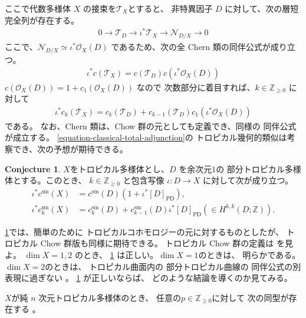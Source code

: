\documentclass[a4paper,dvipdfmx,reqno,12pt]{amsart}
\theoremstyle{definition}
\newtheorem{conjecture}[theorem]{Conjecture}
\newcommand{\PD}[1]{[#1]_{\mathrm{PD}}}
\numberwithin{equation}{section}
\begin{document}
ここで代数多様体 $X$ の接束を$\mathcal{T}_X$とすると、
非特異因子 $D$ に対して、次の層短完全列が存在する。
\begin{align}
0 \to \mathcal{T}_{D}\to \iota^{*}\mathcal{T}_X
\to \mathcal{N}_{D/X}\to 0
\end{align}
ここで、$\mathcal{N}_{D/X}\simeq \iota^{*}\mathcal{O}_X(D)$
であるため、次の全 Chern 類の同伴公式が成り立つ。
\begin{align}
\label{equation-classical-total-adjunction}
\iota^{*}c(\mathcal{T}_X)
=c(\mathcal{T}_{D})c(\iota^{*}\mathcal{O}_X(D))
\end{align}
$c(\mathcal{O}_X(D))=1+c_1(\mathcal{O}_X(D))$ なので
次数部分に着目すれば、$k\in \mathbb{Z}_{\geq 0}$
に対して
\begin{align}
\label{equation-classical-total-adjunction}
\iota^{*}c_k(\mathcal{T}_X)
=c_{k}(\mathcal{T}_{D})+
c_{k-1}(\mathcal{T}_{D})c_1(\iota^{*}\mathcal{O}_X(D))
\end{align}
である。
なお、Chern 類は、Chow 群の元としても定義でき、同様の
同伴公式が成立する。
\eqref{equation-classical-total-adjunction}の
トロピカル幾何的類似は考察でき、次の予想が期待できる。
\begin{conjecture}
\label{conjecture-grr-divisor}
$X$をトロピカル多様体とし、$D$ を余次元$1$の
部分トロピカル多様体とする。このとき、
$k\in \mathbb{Z}_{\geq 0}$ と包含写像
$\iota\colon D \to X$ に対して次が成り立つ。
\begin{align}
\label{equation-total-adjunction}
\iota^{*}c^{\mathrm{sm}}(X)&=c^{\mathrm{sm}}(D)
(1+\iota^{*}\PD{D}), \\ 
\iota^{*}c^{\mathrm{sm}}_k(X)&=c^{\mathrm{sm}}_k(D)+
c^{\mathrm{sm}}_{k-1}(D)\iota^{*}\PD{D}(\in H^{k,k}(D;\mathbb{Z})).
\end{align}
\end{conjecture}
\cref{conjecture-grr-divisor}では、簡単のために
トロピカルコホモロジーの元に対するものとしたが、
トロピカル Chow 群版も同様に期待できる。
トロピカル Chow 群の定義は
\cite[Definition 3.30]{shaw2015tropical} を見よ。
$\dim X=1,2$ のとき、
\cref{conjecture-grr-divisor}
は正しい。$\dim X=1$のときは、
明らかである。
$\dim X=2$のときは、
トロピカル曲面内の
部分トロピカル曲線の
同伴公式の別表現に過ぎない
\cite[Theorem 6]{shaw2015tropical}。
\cref{conjecture-grr-divisor} 
が正しいならば、
どのような結論を導くのか見てみる。

$X$が純 $n$ 次元トロピカル多様体のとき、
任意の$p\in\mathbb{Z}_{\geq 0}$に対して
次の同型が存在する
\cite[Theorem 6.2]{gross2019sheaftheoretic}。
\end{document}
